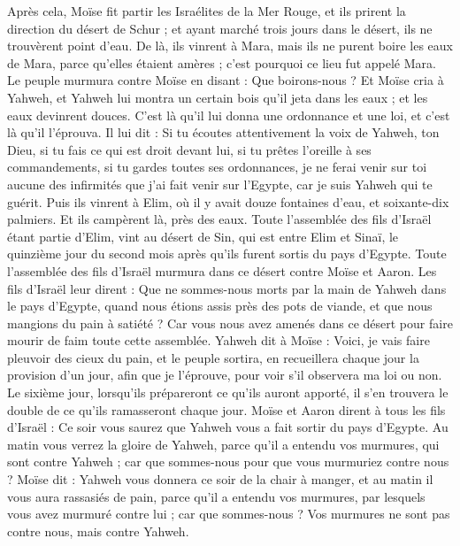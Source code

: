 \begin{multicols}{2}
Après cela, Moïse fit partir les Israélites de la Mer Rouge, et ils prirent la direction du désert de Schur ; et ayant marché trois jours dans le désert, ils ne trouvèrent point d'eau.
De là, ils vinrent à Mara, mais ils ne purent boire les eaux de Mara, parce qu'elles étaient amères ; c'est pourquoi ce lieu fut appelé Mara.
Le peuple murmura contre Moïse en disant : Que boirons-nous ?
Et Moïse cria à Yahweh, et Yahweh lui montra un certain bois qu'il jeta dans les eaux ; et les eaux devinrent douces. C'est là qu'il lui donna une ordonnance et une loi, et c'est là qu'il l'éprouva.
Il lui dit : Si tu écoutes attentivement la voix de Yahweh, ton Dieu, si tu fais ce qui est droit devant lui, si tu prêtes l'oreille à ses commandements, si tu gardes toutes ses ordonnances, je ne ferai venir sur toi aucune des infirmités que j'ai fait venir sur l'Egypte, car je suis Yahweh qui te guérit.
Puis ils vinrent à Elim, où il y avait douze fontaines d'eau, et soixante-dix palmiers. Et ils campèrent là, près des eaux.
\VerseOne{}Toute l'assemblée des fils d'Israël étant partie d'Elim, vint au désert de Sin, qui est entre Elim et Sinaï, le quinzième jour du second mois après qu'ils furent sortis du pays d'Egypte.
Toute l'assemblée des fils d'Israël murmura dans ce désert contre Moïse et Aaron.
Les fils d'Israël leur dirent : Que ne sommes-nous morts par la main de Yahweh dans le pays d'Egypte, quand nous étions assis près des pots de viande, et que nous mangions du pain à satiété ? Car vous nous avez amenés dans ce désert pour faire mourir de faim toute cette assemblée.
Yahweh dit à Moïse : Voici, je vais faire pleuvoir des cieux du pain, et le peuple sortira, en recueillera chaque jour la provision d'un jour, afin que je l'éprouve, pour voir s'il observera ma loi ou non.
Le sixième jour, lorsqu’ils prépareront ce qu’ils auront apporté, il s’en trouvera le double de ce qu’ils ramasseront chaque jour.
Moïse et Aaron dirent à tous les fils d'Israël : Ce soir vous saurez que Yahweh vous a fait sortir du pays d'Egypte.
Au matin vous verrez la gloire de Yahweh, parce qu'il a entendu vos murmures, qui sont contre Yahweh ; car que sommes-nous pour que vous murmuriez contre nous ?
Moïse dit : Yahweh vous donnera ce soir de la chair à manger, et au matin il vous aura rassasiés de pain, parce qu'il a entendu vos murmures, par lesquels vous avez murmuré contre lui ; car que sommes-nous ? Vos murmures ne sont pas contre nous, mais contre Yahweh.

\end{multicols}
